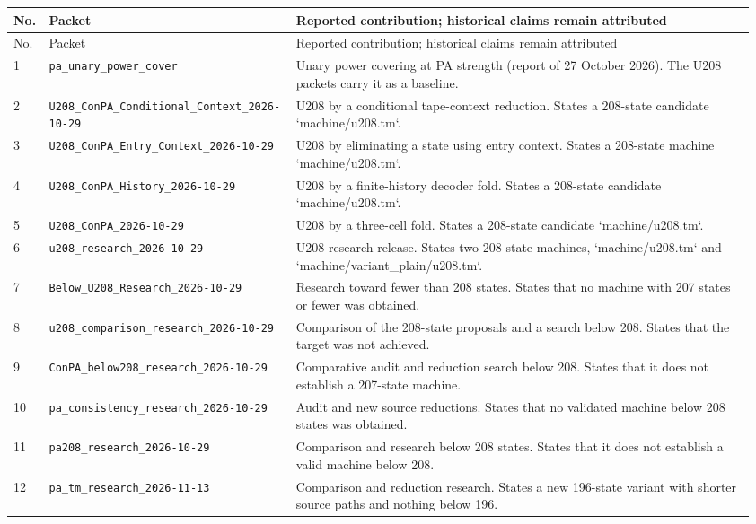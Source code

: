 \begingroup
\small
\setlength{\tabcolsep}{3pt}
\begin{longtable}{p{0.035\linewidth}p{0.31\linewidth}p{0.61\linewidth}}
\toprule
No. & Packet & Reported contribution; historical claims remain attributed\\
\midrule
\endfirsthead
\toprule
No. & Packet & Reported contribution; historical claims remain attributed\\
\midrule
\endhead
1 & \nolinkurl{pa_unary_power_cover} & Unary power covering at PA strength (report of 27 October 2026). The U208 packets carry it as a baseline.\\[4pt]
2 & \nolinkurl{U208_ConPA_Conditional_Context_2026-10-29} & U208 by a conditional tape-context reduction. States a 208-state candidate `machine/u208.tm`.\\[4pt]
3 & \nolinkurl{U208_ConPA_Entry_Context_2026-10-29} & U208 by eliminating a state using entry context. States a 208-state machine `machine/u208.tm`.\\[4pt]
4 & \nolinkurl{U208_ConPA_History_2026-10-29} & U208 by a finite-history decoder fold. States a 208-state candidate `machine/u208.tm`.\\[4pt]
5 & \nolinkurl{U208_ConPA_2026-10-29} & U208 by a three-cell fold. States a 208-state candidate `machine/u208.tm`.\\[4pt]
6 & \nolinkurl{u208_research_2026-10-29} & U208 research release. States two 208-state machines, `machine/u208.tm` and `machine/variant\_plain/u208.tm`.\\[4pt]
7 & \nolinkurl{Below_U208_Research_2026-10-29} & Research toward fewer than 208 states. States that no machine with 207 states or fewer was obtained.\\[4pt]
8 & \nolinkurl{u208_comparison_research_2026-10-29} & Comparison of the 208-state proposals and a search below 208. States that the target was not achieved.\\[4pt]
9 & \nolinkurl{ConPA_below208_research_2026-10-29} & Comparative audit and reduction search below 208. States that it does not establish a 207-state machine.\\[4pt]
10 & \nolinkurl{pa_consistency_research_2026-10-29} & Audit and new source reductions. States that no validated machine below 208 states was obtained.\\[4pt]
11 & \nolinkurl{pa208_research_2026-10-29} & Comparison and research below 208 states. States that it does not establish a valid machine below 208.\\[4pt]
12 & \nolinkurl{pa_tm_research_2026-11-13} & Comparison and reduction research. States a new 196-state variant with shorter source paths and nothing below 196.\\[4pt]

\end{longtable}
